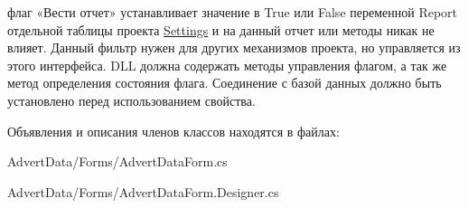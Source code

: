 флаг «Вести отчет» устанавливает значение в True или False переменной Report отдельной таблицы проекта \hyperlink{class_advert_data_1_1_settings}{Settings} и на данный отчет или методы никак не влияет. Данный фильтр нужен для других механизмов проекта, но управляется из этого интерфейса. D\+L\+L должна содержать методы управления флагом, а так же метод определения состояния флага. Соединение с базой данных должно быть установлено перед использованием свойства. 



Объявления и описания членов классов находятся в файлах\+:\begin{DoxyCompactItemize}
\item 
Advert\+Data/\+Forms/Advert\+Data\+Form.\+cs\item 
Advert\+Data/\+Forms/Advert\+Data\+Form.\+Designer.\+cs\end{DoxyCompactItemize}
